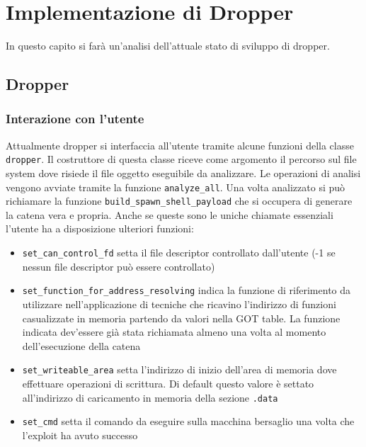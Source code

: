 \chapter{Implementazione di Dropper}
\label{cap:implementazione}
In questo capito si farà un'analisi dell'attuale stato di sviluppo di dropper.

\section{Dropper}

\subsection{Interazione con l'utente}

Attualmente dropper si interfaccia all'utente tramite alcune funzioni
della classe \lstinline{dropper}. Il costruttore di questa classe
riceve come argomento il percorso sul file system dove risiede il file
oggetto eseguibile da analizzare. Le operazioni di analisi vengono
avviate tramite la funzione \lstinline{analyze_all}. Una volta
analizzato si può richiamare la funzione
\lstinline{build_spawn_shell_payload} che si occupera di generare la
catena vera e propria. Anche se queste sono le uniche chiamate
essenziali l'utente ha a disposizione ulteriori funzioni:
\begin{itemize}

\item \lstinline{set_can_control_fd} setta il file descriptor
  controllato dall'utente (-1 se nessun file descriptor può essere
  controllato)

\item \lstinline{set_function_for_address_resolving} indica la
  funzione di riferimento da utilizzare nell'applicazione di tecniche
  che ricavino l'indirizzo di funzioni casualizzate in memoria
  partendo da valori nella GOT table. La funzione indicata dev'essere
  già stata richiamata almeno una volta al momento dell'esecuzione
  della catena

\item \lstinline{set_writeable_area} setta l'indirizzo di inizio
  dell'area di memoria dove effettuare operazioni di scrittura. Di
  default questo valore è settato all'indirizzo di caricamento in
  memoria della sezione \lstinline{.data}

\item \lstinline{set_cmd} setta il comando da eseguire sulla macchina
  bersaglio una volta che l'exploit ha avuto successo

\end{itemize}

